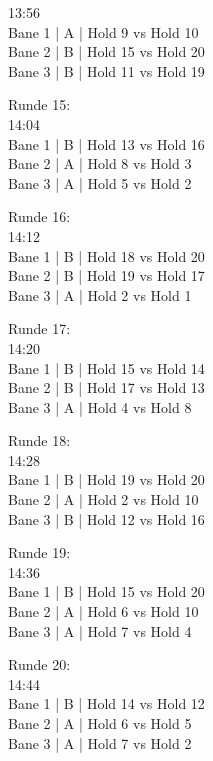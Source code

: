 \begin{multicols}{2}
13:56\\
Bane  1 | A | Hold 9 vs Hold 10\\
Bane  2 | B | Hold 15 vs Hold 20\\
Bane  3 | B | Hold 11 vs Hold 19\\
\par
Runde 15:\\
14:04\\
Bane  1 | B | Hold 13 vs Hold 16\\
Bane  2 | A | Hold 8 vs Hold 3\\
Bane  3 | A | Hold 5 vs Hold 2\\
\par
Runde 16:\\
14:12\\
Bane  1 | B | Hold 18 vs Hold 20\\
Bane  2 | B | Hold 19 vs Hold 17\\
Bane  3 | A | Hold 2 vs Hold 1\\
\par
Runde 17:\\
14:20\\
Bane  1 | B | Hold 15 vs Hold 14\\
Bane  2 | B | Hold 17 vs Hold 13\\
Bane  3 | A | Hold 4 vs Hold 8\\
\par
Runde 18:\\
14:28\\
Bane  1 | B | Hold 19 vs Hold 20\\
Bane  2 | A | Hold 2 vs Hold 10\\
Bane  3 | B | Hold 12 vs Hold 16\\
\par
Runde 19:\\
14:36\\
Bane  1 | B | Hold 15 vs Hold 20\\
Bane  2 | A | Hold 6 vs Hold 10\\
Bane  3 | A | Hold 7 vs Hold 4\\
\par
Runde 20:\\
14:44\\
Bane  1 | B | Hold 14 vs Hold 12\\
Bane  2 | A | Hold 6 vs Hold 5\\
Bane  3 | A | Hold 7 vs Hold 2\\
\end{multicols}
